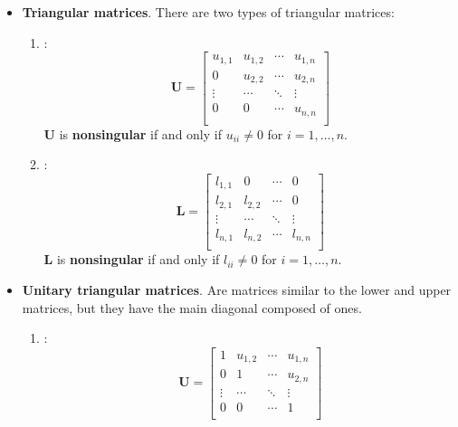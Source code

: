\begin{itemize}
	\item \textbf{Triangular matrices}. There are two types of triangular matrices:
	\begin{enumerate}
		\item {}:
		\begin{equation*}
			\mathbf{U} = \begin{bmatrix}
				u_{1,1} & u_{1,2} & \cdots & u_{1,n} \\
				0 & u_{2,2} & \cdots & u_{2,n} \\
				\vdots & \cdots & \ddots & \vdots \\
				0 & 0 & \cdots & u_{n,n} \\
			\end{bmatrix}
		\end{equation*}
		$\mathbf{U}$ is \textbf{nonsingular} if and only if $u_{ii} \ne 0$ for $i = 1, \dots, n$.

		\item {}:
		\begin{equation*}
			\mathbf{L} = \begin{bmatrix}
				l_{1,1} & 0 & \cdots & 0 \\
				l_{2,1} & l_{2,2} & \cdots & 0 \\
				\vdots & \cdots & \ddots & \vdots \\
				l_{n,1} & l_{n,2} & \cdots & l_{n,n} \\
			\end{bmatrix}
		\end{equation*}
		$\mathbf{L}$ is \textbf{nonsingular} if and only if $l_{ii} \ne 0$ for $i = 1, \dots, n$.
	\end{enumerate}
	
	\item \textbf{Unitary triangular matrices}. Are matrices similar to the lower and upper matrices, but they have the main diagonal composed of ones.
	\begin{enumerate}
		\item {}:
		\begin{equation*}
			\mathbf{U} = \begin{bmatrix}
				1 & u_{1,2} & \cdots & u_{1,n} \\
				0 & 1 & \cdots & u_{2,n} \\
				\vdots & \cdots & \ddots & \vdots \\
				0 & 0 & \cdots & 1 \\
			\end{bmatrix}
		\end{equation*}


\end{enumerate}
\end{itemize}
